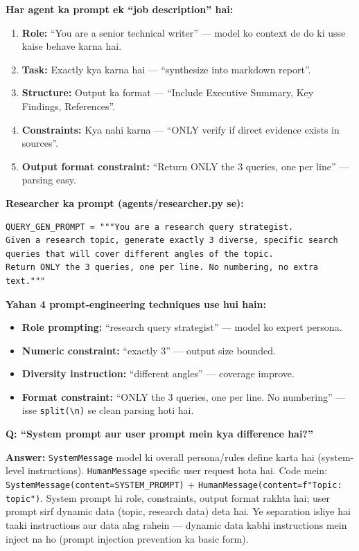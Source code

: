 \documentclass[11pt, a4paper]{article}
\begin{document}
\begin{conceptbox}
\textbf{Har agent ka prompt ek ``job description'' hai:}

\begin{enumerate}[label=\textcolor{accentpurple}{\arabic*.}]
\item \textbf{Role:} ``You are a senior technical writer'' --- model ko context de do ki usse kaise behave karna hai.
\item \textbf{Task:} Exactly kya karna hai --- ``synthesize into markdown report''.
\item \textbf{Structure:} Output ka format --- ``Include Executive Summary, Key Findings, References''.
\item \textbf{Constraints:} Kya nahi karna --- ``ONLY verify if direct evidence exists in sources''.
\item \textbf{Output format constraint:} ``Return ONLY the 3 queries, one per line'' --- parsing easy.
\end{enumerate}
\end{conceptbox}

\begin{codestorybox}
\textbf{Researcher ka prompt (agents/researcher.py se):}
\begin{lstlisting}[style=pythonstyle]
QUERY_GEN_PROMPT = """You are a research query strategist.
Given a research topic, generate exactly 3 diverse, specific search
queries that will cover different angles of the topic.
Return ONLY the 3 queries, one per line. No numbering, no extra text."""
\end{lstlisting}

\textbf{Yahan 4 prompt-engineering techniques use hui hain:}
\begin{itemize}
\item \textbf{Role prompting:} ``research query strategist'' --- model ko expert persona.
\item \textbf{Numeric constraint:} ``exactly 3'' --- output size bounded.
\item \textbf{Diversity instruction:} ``different angles'' --- coverage improve.
\item \textbf{Format constraint:} ``ONLY the 3 queries, one per line. No numbering'' --- isse \texttt{split(\textbackslash n)} se clean parsing hoti hai.
\end{itemize}
\end{codestorybox}

\begin{interviewbox}
\textbf{Q: ``System prompt aur user prompt mein kya difference hai?''}

\textbf{Answer:} \texttt{SystemMessage} model ki overall persona/rules define karta hai (system-level instructions). \texttt{HumanMessage} specific user request hota hai. Code mein: \texttt{SystemMessage(content=SYSTEM\_PROMPT)} + \texttt{HumanMessage(content=f"Topic: {topic}")}. System prompt hi role, constraints, output format rakhta hai; user prompt sirf dynamic data (topic, research data) deta hai. Ye separation isliye hai taaki instructions aur data alag rahein --- dynamic data kabhi instructions mein inject na ho (prompt injection prevention ka basic form).
\end{interviewbox}
\end{document}
